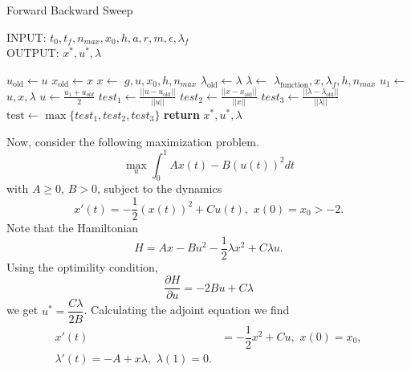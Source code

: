 \begin{algorithm}
	\caption{Forward Backward Sweep }\label{FBSM_alg}
    INPUT: $t_0, t_f, n_{max}, x_0,h, a, r, m, \epsilon, \lambda_{f}$ \\
    OUTPUT: $x^*, u^*, \lambda$ \\
	\begin{algorithmic}[1]
				\State $u_{\text{old}} \gets u$ 
                \State $x_{\text{old}} \gets x$ 
                \State $ x \gets$ %
                        {$g, u, x_0, h,n_{max}$}
                \State $\lambda_{\text{old}} \gets \lambda $
				\State $\lambda \gets$ %
				        {$\lambda_{\text{function}}, x, \lambda_f, h, n_{max}$}
                \State $\displaystyle u_1 \gets$  %
                        {$u, x, \lambda$}
                \State $\displaystyle u \gets \frac{u_1 + u_{old}}{2}$
                \State $test_1 \gets \displaystyle 
                \frac{||u - u_{\text{old}}||}{||u||}$
                \State $test_2 \gets \displaystyle 
                \frac{||x - x_{\text{old}}||}{||x||}$
                \State $test_3 \gets \displaystyle 
                \frac{||\lambda - \lambda_{\text{old}}||}{||\lambda||}$
                \State $\text{test} \gets \max{ \{ test_1, test_2, test_3 \}}$
			\EndWhile\label{}
			\State \textbf{return} $ x^*, u^*, \lambda$
		\EndProcedure
	\end{algorithmic}
\end{algorithm}

    Now, consider the following maximization problem.
    \begin{equation*}
        \max_{u} \int_{0}^{1} Ax(t) - B(u(t))^{2} dt
    \end{equation*}
    with $A \geq 0$, $B>0$, subject to the dynamics
    \begin{equation*}
        x'(t) = -\dfrac{1}{2}(x(t))^{2} + Cu(t), \, \, x(0) = x_0 >-2.
    \end{equation*}
    Note that the Hamiltonian 
    $$
        H = Ax - Bu^2 - \dfrac{1}{2}\lambda x^2 + C\lambda u.
    $$
    Using the optimility condition, 
    $$
        \dfrac{\partial H}{\partial u} = -2Bu + C\lambda
    $$
    we get $u^{*} = \dfrac{C\lambda}{2B}$. Calculating the adjoint equation we
    find
    \begin{align*}
        x'(t) &= -\dfrac{1}{2}x^2 + Cu, \, \, x(0) = x_0, \\
        \lambda'(t) = -A + x \lambda, \, \, \lambda(1) = 0.
    \end{align*}
    
    

    



%    
%    

\newpage